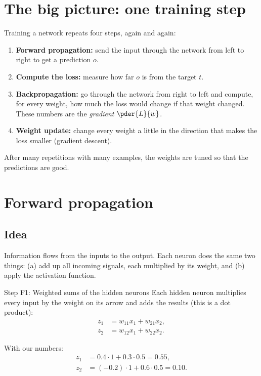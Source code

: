 \section{The big picture: one training step}

Training a network repeats four steps, again and again:
\begin{enumerate}[label=\textbf{Step \arabic*.}, leftmargin=*, itemsep=0.2em]
  \item \textbf{Forward propagation:} send the input through the network from left to right to get a prediction $o$.
  \item \textbf{Compute the loss:} measure how far $o$ is from the target $t$.
  \item \textbf{Backpropagation:} go through the network from right to left and compute, for every weight, how much the loss would change if that weight changed. These numbers are the \emph{gradient} $\pder{L}{w}$.
  \item \textbf{Weight update:} change every weight a little in the direction that makes the loss smaller (gradient descent).
\end{enumerate}
After many repetitions with many examples, the weights are tuned so that the predictions are good.

\section{Forward propagation}

\subsection*{Idea}
Information flows from the inputs to the output. Each neuron does the same two things: (a) add up all incoming signals, each multiplied by its weight, and (b) apply the activation function.

\begin{stepbox}{Step F1: Weighted sums of the hidden neurons}
Each hidden neuron multiplies every input by the weight on its arrow and adds the results (this is a dot product):
\begin{align*}
z_1&=w_{11}x_1+w_{21}x_2,\\
z_2&=w_{12}x_1+w_{22}x_2.
\end{align*}
\end{stepbox}

With our numbers:
\begin{align*}
z_1&=0.4\cdot1+0.3\cdot0.5=0.55,\\
z_2&=(-0.2)\cdot1+0.6\cdot0.5=0.10.
\end{align*}

